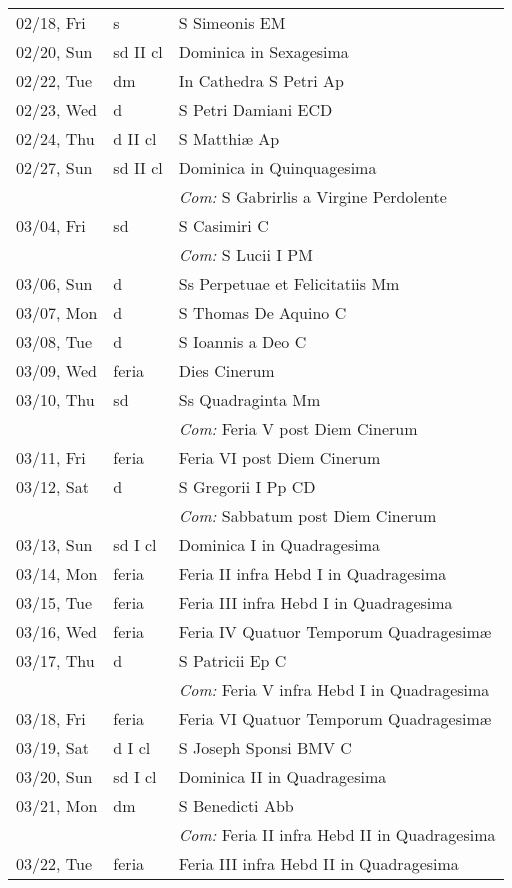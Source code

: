 \documentclass[10pt]{article}
\begin{document}
\begin{longtable}{ l l l }
02/18, Fri & s & S Simeonis EM\\
02/20, Sun & sd II cl & Dominica in Sexagesima\\
02/22, Tue & dm & In Cathedra S Petri Ap\\
02/23, Wed & d & S Petri Damiani ECD\\
02/24, Thu & d II cl & S Matthiæ Ap\\
02/27, Sun & sd II cl & Dominica in Quinquagesima\\
 & & \textit{Com:} S Gabrirlis a Virgine Perdolente\\
03/04, Fri & sd & S Casimiri C\\
 & & \textit{Com:} S Lucii I PM\\
03/06, Sun & d & Ss Perpetuae et Felicitatiis Mm\\
03/07, Mon & d & S Thomas De Aquino C\\
03/08, Tue & d & S Ioannis a Deo C\\
03/09, Wed & feria & Dies Cinerum\\
03/10, Thu & sd & Ss Quadraginta Mm\\
 & & \textit{Com:} Feria V post Diem Cinerum\\
03/11, Fri & feria & Feria VI post Diem Cinerum\\
03/12, Sat & d & S Gregorii I Pp CD\\
 & & \textit{Com:} Sabbatum post Diem Cinerum\\
03/13, Sun & sd I cl & Dominica I in Quadragesima\\
03/14, Mon & feria & Feria II infra Hebd I in Quadragesima\\
03/15, Tue & feria & Feria III infra Hebd I in Quadragesima\\
03/16, Wed & feria & Feria IV Quatuor Temporum Quadragesimæ\\
03/17, Thu & d & S Patricii Ep C\\
 & & \textit{Com:} Feria V infra Hebd I in Quadragesima\\
03/18, Fri & feria & Feria VI Quatuor Temporum Quadragesimæ\\
03/19, Sat & d I cl & S Joseph Sponsi BMV C\\
03/20, Sun & sd I cl & Dominica II in Quadragesima\\
03/21, Mon & dm & S Benedicti Abb\\
 & & \textit{Com:} Feria II infra Hebd II in Quadragesima\\
03/22, Tue & feria & Feria III infra Hebd II in Quadragesima\\

\end{longtable}
\end{document}
